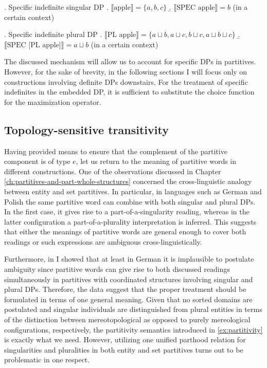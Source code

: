 	\ex. Specific indefinite singular DP\label{ex:specific-indefinite-singular}
	\a. $\llbracket \text{apple}\rrbracket = \{a,b,c\}$\label{ex:specific-indefinite-singular-sg}
	\b. $\llbracket \text{SPEC apple}\rrbracket = b$ (in a certain context)\label{ex:specific-indefinite-singular-spec-sg}
	
	\ex. Specific indefinite plural DP\label{ex:specific-indefinite-plural}
	\a. $\llbracket \text{PL apple}\rrbracket = \{a\sqcup b, a\sqcup c, b\sqcup c, a\sqcup b\sqcup c\}$\label{ex:specific-indefinite-plural-pl}
	\b. $\llbracket \text{SPEC [PL apple]}\rrbracket = a\sqcup b$ (in a certain context)\label{ex:specific-indefinite-plural-spec-pl}
	
	The discussed mechanism will allow us to account for specific DPs in partitives. However, for the sake of brevity, in the following sections I will focus only on constructions involving definite DPs downstairs. For the treatment of specific indefinites in the embedded DP, it is sufficient to substitute the choice function for the maximization operator.
	
	\subsection{Topology-sensitive transitivity}\label{sec:set-partitive-constraint}
	
	Having provided means to ensure that the complement of the partitive component is of type $e$, let us return to the meaning of partitive words in different constructions. One of the observations discussed in Chapter \ref{ch:partitives-and-part-whole-structures} concerned the cross-linguistic analogy between entity and set partitives. In particular, in languages such as German and Polish the same partitive word can combine with both singular and plural DPs. In the first case, it gives rise to a part-of-a-singularity reading, whereas in the latter configuration a part-of-a-plurality interpretation is inferred. This suggests that either the meanings of partitive words are general enough to cover both readings or such expressions are ambiguous cross-linguistically. 
	
	Furthermore, in   I showed that at least in German it is implausible to postulate ambiguity since partitive words can give rise to both discussed readings simultaneously in partitives with coordinated structures involving singular and plural DPs. Therefore, the data suggest that the proper treatment should be formulated in terms of one general meaning. Given that no sorted domains are postulated and singular individuals are distinguished from plural entities in terms of the distinction between mereotopological as opposed to purely mereological configurations, respectively, the partitivity semantics introduced in \ref{ex:partitivity} is exactly what we need. However, utilizing one unified parthood relation for singularities and pluralities in both entity and set partitives turns out to be problematic in one respect.
	
